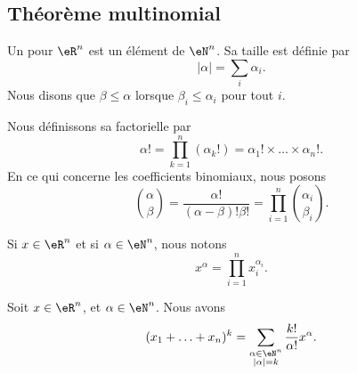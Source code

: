 \subsection{Théorème multinomial}

\begin{definition}		\label{DEFooCQPRooFeWeOS}
	Un  pour \( \eR^n\) est un élément de \( \eN^n\). Sa taille est définie par
	\begin{equation}
		| \alpha |=\sum_i\alpha_i.
	\end{equation}
	Nous disons que \( \beta\leq \alpha\) lorsque \( \beta_i\leq \alpha_i\) pour tout \( i\).

	Nous définissons sa factorielle par
	\begin{equation}
		\alpha!=\prod_{k=1}^n(\alpha_k!)=\alpha_1!\times\ldots \times \alpha_n!.
	\end{equation}
	En ce qui concerne les coefficients binomiaux, nous posons
	\begin{equation}		\label{EQooKBURooKFBxnt}
		\binom{ \alpha }{ \beta }=\frac{ \alpha! }{ (\alpha-\beta)!\beta! }=\prod_{i=1}^n\binom{ \alpha_i }{ \beta_i }.
	\end{equation}

	Si \( x\in \eR^n\) et si \( \alpha\in \eN^n\), nous notons
	\begin{equation}
		x^{\alpha}=\prod_{i=1}^nx_i^{\alpha_i}.
	\end{equation}
\end{definition}

\begin{theorem}		\label{THOooNHAUooQvuytn}
	Soit \( x\in \eR^n\), et \( \alpha\in \eN^n\). Nous avons
	\begin{equation}
		(x_1+\ldots+x_n)^k=\sum_{\substack{ \alpha\in \eN^n \\ | \alpha |=k }  } \frac{ k! }{ \alpha! }x^{\alpha}.
	\end{equation}
\end{theorem}

